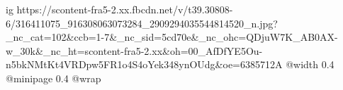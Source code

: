 
 
 
 
 

\ifcmt
  ig https://scontent-fra5-2.xx.fbcdn.net/v/t39.30808-6/316411075_916308063073284_2909294035544814520_n.jpg?_nc_cat=102&ccb=1-7&_nc_sid=5cd70e&_nc_ohc=QDjuW7K_AB0AX-w_30k&_nc_ht=scontent-fra5-2.xx&oh=00_AfDfYE5Ou-n5bkNMtKt4VRDpw5FR1o4S4oYek348ynOUdg&oe=6385712A
  @width 0.4
  @minipage 0.4
  @wrap \parpic[r]
\fi

